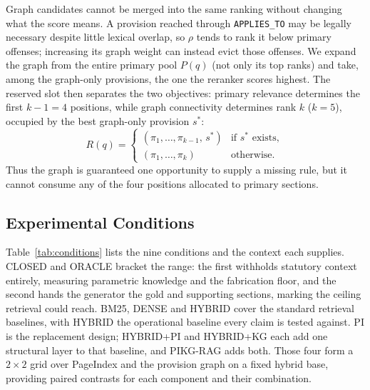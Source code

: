 \documentclass[conference]{IEEEtran}
\begin{document}
Graph candidates cannot be merged into the same ranking without changing what the score means. A
provision reached through \texttt{APPLIES\_TO} may be legally necessary despite little lexical
overlap, so $\rho$ tends to rank it below primary offenses; increasing its graph weight can instead
evict those offenses. We expand the graph from the entire primary pool $P(q)$ (not only its top
ranks) and take, among the graph-only provisions, the one the reranker scores highest. The reserved
slot then separates the two objectives: primary relevance determines the first $k-1=4$ positions,
while graph connectivity determines rank $k$ ($k=5$), occupied by the best graph-only provision
$s^*$:
\begin{equation}
R(q)=
\begin{cases}
(\pi_1,\dots,\pi_{k-1},\,s^*) & \text{if }s^*\text{ exists},\\[2pt]
(\pi_1,\dots,\pi_k) & \text{otherwise.}
\end{cases}
\label{eq:reserve}
\end{equation}
Thus the graph is guaranteed one opportunity to supply a missing rule, but it cannot consume any of
the four positions allocated to primary sections.

\subsection{Experimental Conditions}

Table~\ref{tab:conditions} lists the nine conditions and the context each supplies. CLOSED and
ORACLE bracket the range: the first withholds statutory context entirely, measuring parametric
knowledge and the fabrication floor, and the second hands the generator the gold and supporting
sections, marking the ceiling retrieval could reach. BM25, DENSE and HYBRID cover the standard
retrieval baselines, with HYBRID the operational baseline every claim is tested against. PI is the
replacement design; HYBRID+PI and HYBRID+KG each add one structural layer to that baseline, and
PIKG-RAG adds both. Those four form a $2 \times 2$ grid over PageIndex and the provision graph on a
fixed hybrid base, providing paired contrasts for each component and their combination.
\end{document}

